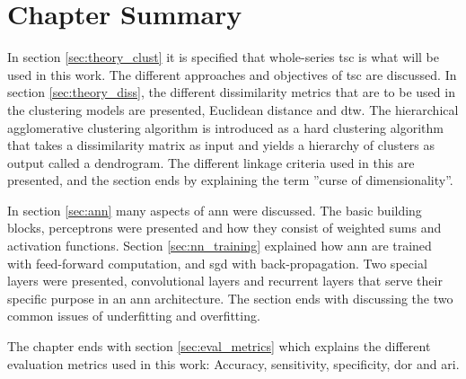 \section{Chapter Summary}

In section \ref{sec:theory_clust} it is specified that whole-series \acrshort{tsc} is what will be used in this work. The different approaches and objectives of \acrshort{tsc} are discussed. In section \ref{sec:theory_diss}, the different dissimilarity metrics that are to be used in the clustering models are presented, Euclidean distance and \acrshort{dtw}. The hierarchical agglomerative clustering algorithm is introduced as a hard clustering algorithm that takes a dissimilarity matrix as input and yields a hierarchy of clusters as output called a dendrogram. The different linkage criteria used in this are presented, and the section ends by explaining the term ''curse of dimensionality''. \bigskip

In section \ref{sec:ann} many aspects of \acrshort{ann} were discussed. The basic building blocks, perceptrons were presented and how they consist of weighted sums and activation functions. Section \ref{sec:nn_training} explained how \acrshort{ann} are trained with feed-forward computation, and \acrshort{sgd} with back-propagation. Two special layers were presented, convolutional layers and recurrent layers that serve their specific purpose in an \acrshort{ann} architecture. The section ends with discussing the two common issues of underfitting and overfitting. \bigskip
 
The chapter ends with section \ref{sec:eval_metrics} which explains the different evaluation metrics used in this work: Accuracy, sensitivity, specificity, \acrshort{dor} and \acrshort{ari}.
